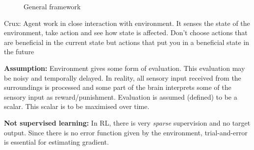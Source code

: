 \documentclass[a4paper]{article}
\begin{document}
\begin{figure}[!htbp]
\begin{center}
\end{center}
\caption{General framework}\label{rlflow}
\end{figure}

Crux: Agent work in close interaction with environment. It senses the state of the environment, take action and see how state is affected. Don't choose actions that are beneficial in the current state but actions that put you in a beneficial state in the future

\textbf{Assumption:} Environment gives some form of evaluation. This evaluation may be noisy and temporally delayed. In reality, all sensory input received from the surroundings is processed and some part of the brain interprets some of the sensory input as reward/punishment. Evaluation is assumed (defined) to be a scalar. This scalar is to be maximised over time.

\textbf{Not supervised learning: } In RL, there is very \textit{sparse} supervision and no target output. Since there is no error function given by the environment, trial-and-error is essential for estimating gradient.
\end{document}
